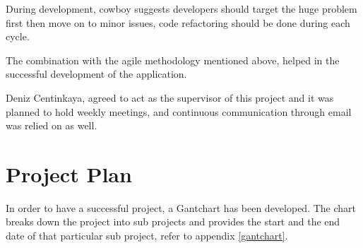 During development, cowboy suggests developers should target the huge problem first then move on to minor issues, code refactoring should be done during each cycle.

The combination with the agile methodology mentioned above, helped in the successful development of the application.

Deniz Centinkaya, agreed to act as the supervisor of this project and it was planned to hold weekly meetings, and continuous communication through email was relied on as well. 

\section{Project Plan}
In order to have a successful project, a Gantchart has been developed. The chart breaks down the project into sub projects and provides the start and the end date of that particular sub project, refer to appendix \ref{gantchart}.
